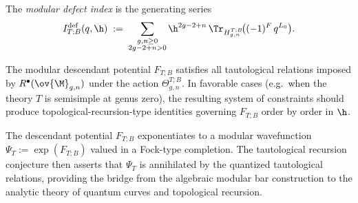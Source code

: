 \begin{definition}
\label{def:modular-defect-index}
The \emph{modular defect index} is the generating series
\begin{equation}
\label{eq:modular-defect-index}
I_{T;B}^{\mathrm{def}}(q,\h)
\;:=\;
\sum_{\substack{g,n \geq 0 \\ 2g-2+n > 0}}
\h^{2g-2+n}\,
\Tr_{H_{g,n}^{T;B}}\!\bigl((-1)^F\,q^{L_0}\bigr).
\end{equation}
\end{definition}

\begin{conjecture}
\label{conj:tautological-recursion}
The modular descendant potential $F_{T;B}$ satisfies all tautological relations imposed by
$R^\bullet(\ov{\M}_{g,n})$ under the action $\Theta_{g,n}^{T;B}$.  In favorable cases
(e.g.\ when the theory $T$ is semisimple at genus zero), the resulting system of
constraints should produce topological-recursion-type identities governing $F_{T;B}$
order by order in $\h$.
\end{conjecture}

\begin{remark}
\label{rem:descendant-wavefunction}
The descendant potential $F_{T;B}$ exponentiates to a modular wavefunction
$\Psi_T := \exp(F_{T;B})$ valued in a Fock-type completion.  The tautological recursion
conjecture then asserts that $\Psi_T$ is annihilated by the quantized tautological
relations, providing the bridge from the algebraic modular bar construction to the
analytic theory of quantum curves and topological recursion.
\end{remark}

